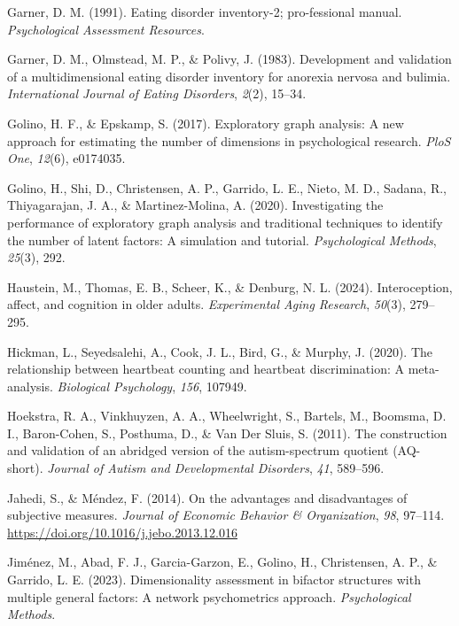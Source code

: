 \documentclass[
  jou,
  floatsintext,
  longtable,
  nolmodern,
  notxfonts,
  notimes,
  colorlinks=true,linkcolor=blue,citecolor=blue,urlcolor=blue]{apa7}
\newlength{\cslhangindent}
\newenvironment{CSLReferences}[2] %
 {\begin{list}{}{%
  \setlength{\itemindent}{0pt}
  \setlength{\leftmargin}{0pt}
  \setlength{\parsep}{0pt}
  \ifodd #1
   \setlength{\leftmargin}{\cslhangindent}
   \setlength{\itemindent}{-1\cslhangindent}
  \fi
  \setlength{\itemsep}{#2\baselineskip}}}
 {\end{list}}
\begin{document}
\begin{CSLReferences}{1}{0}
Garner, D. M. (1991). Eating disorder inventory-2; pro-fessional manual.
\emph{Psychological Assessment Resources}.

Garner, D. M., Olmstead, M. P., \& Polivy, J. (1983). Development and
validation of a multidimensional eating disorder inventory for anorexia
nervosa and bulimia. \emph{International Journal of Eating Disorders},
\emph{2}(2), 15--34.

Golino, H. F., \& Epskamp, S. (2017). Exploratory graph analysis: A new
approach for estimating the number of dimensions in psychological
research. \emph{PloS One}, \emph{12}(6), e0174035.

Golino, H., Shi, D., Christensen, A. P., Garrido, L. E., Nieto, M. D.,
Sadana, R., Thiyagarajan, J. A., \& Martinez-Molina, A. (2020).
Investigating the performance of exploratory graph analysis and
traditional techniques to identify the number of latent factors: A
simulation and tutorial. \emph{Psychological Methods}, \emph{25}(3),
292.

Haustein, M., Thomas, E. B., Scheer, K., \& Denburg, N. L. (2024).
Interoception, affect, and cognition in older adults. \emph{Experimental
Aging Research}, \emph{50}(3), 279--295.

Hickman, L., Seyedsalehi, A., Cook, J. L., Bird, G., \& Murphy, J.
(2020). The relationship between heartbeat counting and heartbeat
discrimination: A meta-analysis. \emph{Biological Psychology},
\emph{156}, 107949.

Hoekstra, R. A., Vinkhuyzen, A. A., Wheelwright, S., Bartels, M.,
Boomsma, D. I., Baron-Cohen, S., Posthuma, D., \& Van Der Sluis, S.
(2011). The construction and validation of an abridged version of the
autism-spectrum quotient (AQ-short). \emph{Journal of Autism and
Developmental Disorders}, \emph{41}, 589--596.

Jahedi, S., \& Méndez, F. (2014). On the advantages and disadvantages of
subjective measures. \emph{Journal of Economic Behavior \&
Organization}, \emph{98}, 97--114.
\url{https://doi.org/10.1016/j.jebo.2013.12.016}

Jiménez, M., Abad, F. J., Garcia-Garzon, E., Golino, H., Christensen, A.
P., \& Garrido, L. E. (2023). Dimensionality assessment in bifactor
structures with multiple general factors: A network psychometrics
approach. \emph{Psychological Methods}.


\end{CSLReferences}
\end{document}
